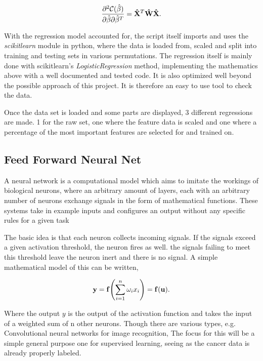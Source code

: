 \documentclass[10pt]{article}
\begin{document}
\begin{align}
	\pdv[2]{\mathcal{C}(\hat{\beta})}{\hat{\beta}}{\hat{\beta}^T} 
		= \mathbf{\hat{X}}^T \mathbf{\hat{W}} \mathbf{\hat{X}}
	\label{Cost2ndDerivative}.
\end{align}

With the regression model accounted for, the script itself imports and uses the
\emph{scikitlearn} module in python, where the data is loaded from, scaled and
split into training and testing sets in various permutations. The regression itself is
mainly done with scikitlearn's \emph{LogisticRegression} method, implementing
the mathematics above with a well documented and tested code. It is also
optimized well beyond the possible approach of this project. It is therefore an
easy to use tool to check the data. 

Once the data set is loaded and some parts are displayed, 3 different
regressions are made. 1 for the raw set, one where the feature data is scaled
and one where a percentage of the most important features are selected for and
trained on.

\subsection{Feed Forward Neural Net}

A neural network is a computational model which aims to imitate the workings of
biological neurons, where an arbitrary amount of layers, each with an arbitrary
number of neurons exchange signals in the form of mathematical functions. These
systems take in example inputs and configures an output without any specific
rules for a given task

The basic idea is that each neuron collects incoming signals. If the signals exceed
a given activation threshold, the neuron fires as well. the signals failing to meet this
threshold leave the neuron inert and there is no signal. A simple mathematical model of this
can be written,

\begin{align}
	\mathbf{y} = \mathbf{f}\qty(\sum_{i=1}^n \omega_i x_i) = \mathbf{f}(\mathbf{u})
	\label{simpleNeuron}. 
\end{align}

Where the output $y$ is the output of the activation function and takes the
input of a weighted sum of n other neurons. Though there are various types,
e.g. Convolutional neural networks for image recognition, The focus for this
will be a simple general purpose one for supervised learning, seeing as the
cancer data is already properly labeled. 
\end{document}
